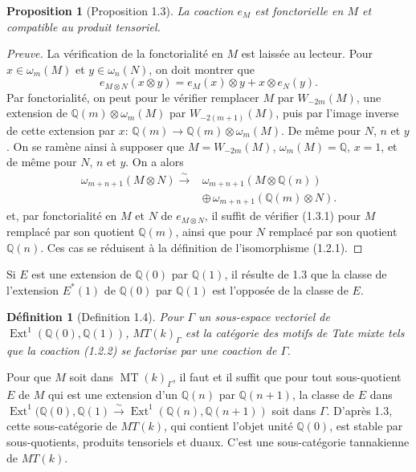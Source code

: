 \documentclass[11pt,a4paper]{article}
\theoremstyle{plain}
\newtheorem{proposition}[theorem]{Proposition}
\theoremstyle{definition}
\newtheorem{definition}[theorem]{D\'efinition}
\theoremstyle{remark}
\DeclareMathOperator{\Ext}{Ext}
\DeclareMathOperator{\MT}{MT}
\newcommand{\dbQ}{\mathbb{Q}}
\newcommand{\simover}{\xrightarrow{\sim}}
\providecommand{\Ext}{\operatorname{Ext}}
\begin{document}
\begin{proposition}[Proposition 1.3]La coaction $e_M$ est fonctorielle en $M$ et
compatible au produit tensoriel.\end{proposition}
\begin{proof}[Preuve]La v\'erification de la fonctorialit\'e en $M$
est laiss\'ee au lecteur.
Pour $x\in\omega_m(M)$ et $y\in\omega_n(N)$, on
doit montrer que
\begin{equation}
e_{M\otimes N}(x\otimes y)=e_M(x)\otimes y
+x\otimes e_N(y).
\tag{1.3.1}
\end{equation}
Par fonctorialit\'e, on peut pour le
v\'erifier remplacer $M$ par $W_{-2m}(M)$, une
extension de $\dbQ(m)\otimes\omega_m(M)$ par
$W_{-2(m+1)}(M)$, puis par l'image inverse de
cette extension par
$x\colon\,\dbQ(m)\to\dbQ(m)\otimes\omega_m(M)$.
De m\^{e}me pour $N$, $n$ et $y$.
On se ram\`ene ainsi \`a supposer que
$M=W_{-2m}(M)$, $\omega_m(M)=\dbQ$, $x=1$, et
de m\^{e}me pour $N$, $n$ et $y$.
On a alors
\begin{align}
\omega_{m+n+1}(M\otimes N)\simover
  &\omega_{m+n+1}(M\otimes\dbQ(n))\\
  &\oplus\,\omega_{m+n+1}(\dbQ(m)\otimes N).
\end{align}
et, par fonctorialit\'e en $M$ et $N$ de
$e_{M\otimes N}$, il suffit de v\'erifier
(1.3.1) pour $M$ remplac\'e par son quotient
$\dbQ(m)$, ainsi que pour $N$ remplac\'e par
son quotient $\dbQ(n)$.
Ces cas se r\'eduisent \`a la d\'efinition de
l'isomorphisme (1.2.1).\end{proof}

Si $E$ est une extension de $\dbQ(0)$ par
$\dbQ(1)$, il r\'esulte de 1.3 que la classe
de l'extension $E^*(1)$ de $\dbQ(0)$ par
$\dbQ(1)$ est l'oppos\'ee de la classe de $E$.

\begin{definition}[Definition 1.4]
{\it Pour $\Gamma$ un sous-espace vectoriel de
$\Ext^1(\dbQ(0),\dbQ(1))$, 
$MT(k)_\Gamma$ est la cat\'egorie des motifs de
Tate mixte tels que la coaction (1.2.2) se
factorise par une coaction de $\Gamma$}.
\end{definition}

Pour que $M$ soit dans $\MT(k)_\Gamma$, il
faut et il suffit que pour tout sous-quotient
$E$ de $M$ qui est une extension d'un
$\dbQ(n)$ par $\dbQ(n+1)$, la classe de $E$
dans 
$\Ext^1(\dbQ(0),\dbQ(1)\simover \Ext^1
(\dbQ(n),\dbQ(n+1))$
soit dans $\Gamma$. 
D'apr\`es 1.3, cette sous-cat\'egorie de
$MT(k)$, qui contient l'objet unit\'e $\dbQ(0)$,
est stable par sous-quotients, produits
tensoriels et duaux.
C'est une sous-cat\'egorie tannakienne de
$MT(k)$.
\end{document}

